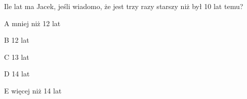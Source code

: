 \begin{tresc}
Ile lat ma Jacek, jeśli wiadomo, że jest trzy razy starszy niż był 10 lat temu?
\end{tresc}
\begin{wariant}{A} mniej niż 12 lat \end{wariant}
\begin{wariant}{B} 12 lat \end{wariant}
\begin{wariant}{C} 13 lat \end{wariant}
\begin{wariant}{D} 14 lat \end{wariant}
\begin{wariant}{E} więcej niż 14 lat \end{wariant}
